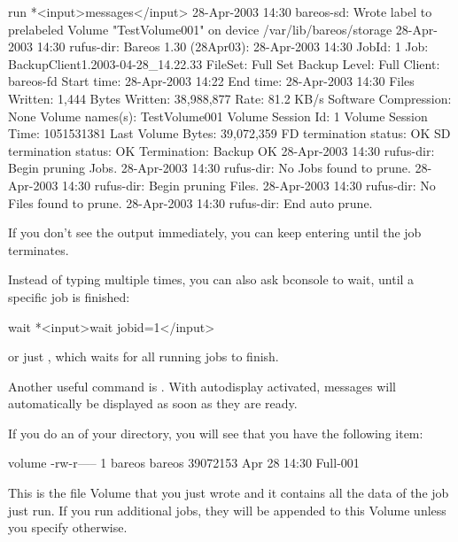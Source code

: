 
\begin{bconsole}{run}
*<input>messages</input>
28-Apr-2003 14:30 bareos-sd: Wrote label to prelabeled Volume
   "TestVolume001" on device /var/lib/bareos/storage
28-Apr-2003 14:30 rufus-dir: Bareos 1.30 (28Apr03): 28-Apr-2003 14:30
JobId:                  1
Job:                    BackupClient1.2003-04-28_14.22.33
FileSet:                Full Set
Backup Level:           Full
Client:                 bareos-fd
Start time:             28-Apr-2003 14:22
End time:               28-Apr-2003 14:30
Files Written:          1,444
Bytes Written:          38,988,877
Rate:                   81.2 KB/s
Software Compression:   None
Volume names(s):        TestVolume001
Volume Session Id:      1
Volume Session Time:    1051531381
Last Volume Bytes:      39,072,359
FD termination status:  OK
SD termination status:  OK
Termination:            Backup OK
28-Apr-2003 14:30 rufus-dir: Begin pruning Jobs.
28-Apr-2003 14:30 rufus-dir: No Jobs found to prune.
28-Apr-2003 14:30 rufus-dir: Begin pruning Files.
28-Apr-2003 14:30 rufus-dir: No Files found to prune.
28-Apr-2003 14:30 rufus-dir: End auto prune.
\end{bconsole}

If you don't see the output immediately, you can keep entering 
until the job terminates.

Instead of typing  multiple times,
you can also ask bconsole to wait, until a specific job is finished:

\begin{bconsole}{wait}
*<input>wait jobid=1</input>
\end{bconsole}
or just , which waits for all running jobs to finish.

Another useful command is .
With autodisplay activated, messages will automatically be displayed as soon as they are ready.

If you do an  of your  directory, you will see that you
have the following item:

\footnotesize
\begin{bconsole}{volume}
-rw-r-----    1 bareos bareos   39072153 Apr 28 14:30 Full-001
\end{bconsole}
\normalsize

This is the file Volume that you just wrote and it contains all the data of
the job just run. If you run additional jobs, they will be appended to this
Volume unless you specify otherwise.

